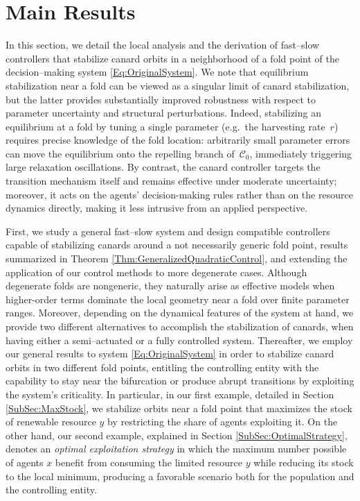 \documentclass[3p]{elsarticle}
\theoremstyle{plain}
\theoremstyle{remark}
\theoremstyle{definition}
\begin{document}
\section{Main Results}\label{Sec:Results}

    In this section, we detail the local analysis and the derivation of fast--slow controllers that stabilize canard orbits in a neighborhood of a fold point of the decision--making system \eqref{Eq:OriginalSystem}. We note that equilibrium stabilization near a fold can be viewed as a singular limit of canard stabilization, but the latter provides substantially improved robustness with respect to parameter uncertainty and structural perturbations. Indeed, stabilizing an equilibrium at a fold by tuning a single
parameter (e.g.\ the harvesting rate~$r$) requires precise knowledge of
the fold location: arbitrarily small parameter errors can move the
equilibrium onto the repelling branch of~$\mathcal{C}_0$, immediately
triggering large relaxation oscillations.  By contrast, the canard
controller targets the transition mechanism itself and remains effective
under moderate uncertainty; moreover, it acts on the agents'
decision-making rules rather than on the resource dynamics directly,
making it less intrusive from an applied perspective.
    
    First, we study a general fast--slow system and design compatible controllers capable of stabilizing canards around a not necessarily generic fold point, results summarized in Theorem \ref{Thm:GeneralizedQuadraticControl}, and extending the application of our control methods to more degenerate cases. Although degenerate folds are nongeneric, they naturally arise as effective models when higher-order terms dominate the local geometry near a fold over finite parameter ranges. Moreover, depending on the dynamical features of the system at hand, we provide two different alternatives to accomplish the stabilization of canards, when having either a semi--actuated or a fully controlled system. Thereafter, we employ our general results to system \eqref{Eq:OriginalSystem} in order to stabilize canard orbits in two different fold points, entitling the controlling entity with the capability to stay near the bifurcation or produce abrupt transitions by exploiting the system's criticality. In particular, in our first example, detailed in Section \ref{SubSec:MaxStock}, we stabilize orbits near a fold point that maximizes the stock of renewable resource $y$ by restricting the share of agents exploiting it. On the other hand, our second example, explained in Section \ref{SubSec:OptimalStrategy}, denotes an \emph{optimal exploitation strategy} in which the maximum number possible of agents $x$ benefit from consuming the limited resource $y$ while reducing its stock to the local minimum, producing a favorable scenario both for the population and the controlling entity.
\end{document}
